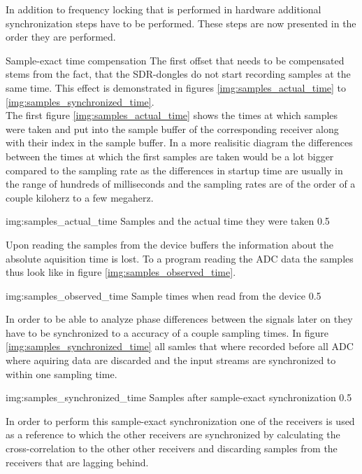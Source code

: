 In addition to frequency locking that is performed in
hardware additional synchronization steps have to
be performed. These steps are now presented in the
order they are performed. \\

\begin{subchapter}{Sample-exact time compensation}
  The first offset that needs to be compensated stems
  from the fact, that the SDR-dongles do not start
  recording samples at the same time.
  This effect is demonstrated in figures
  \ref{img:samples_actual_time} to \ref{img:samples_synchronized_time}. \\

  The first figure \ref{img:samples_actual_time} shows the
  times at which samples were taken and put into the
  sample buffer of the corresponding receiver along
  with their index in the sample buffer.
  In a more realisitic diagram the differences between the
  times at which the first samples are taken would be
  a lot bigger compared to the sampling rate as the
  differences in startup time are usually in the range
  of hundreds of milliseconds and the sampling rates are
  of the order of a couple kiloherz to a few megaherz.

               {img:samples_actual_time}
               {Samples and the actual time they were taken}
               {0.5}

  Upon reading the samples from the device buffers
  the information about the absolute aquisition time is
  lost. To a program reading the ADC data the
  samples thus look like in figure \ref{img:samples_observed_time}.

               {img:samples_observed_time}
               {Sample times when read from the device}
               {0.5}

  In order to be able to analyze phase differences between
  the signals later on they have to be synchronized to
  a accuracy of a couple sampling times.
  In figure \ref{img:samples_synchronized_time} all
  samles that where recorded before all ADC where aquiring
  data are discarded and the input streams are
  synchronized to within one sampling time.

               {img:samples_synchronized_time}
               {Samples after sample-exact synchronization}
               {0.5}

  In order to perform this sample-exact synchronization
  one of the receivers is used as a reference to which
  the other receivers are synchronized by calculating the
  cross-correlation to the other other receivers and discarding
  samples from the receivers that are lagging behind. \\


\end{subchapter}
